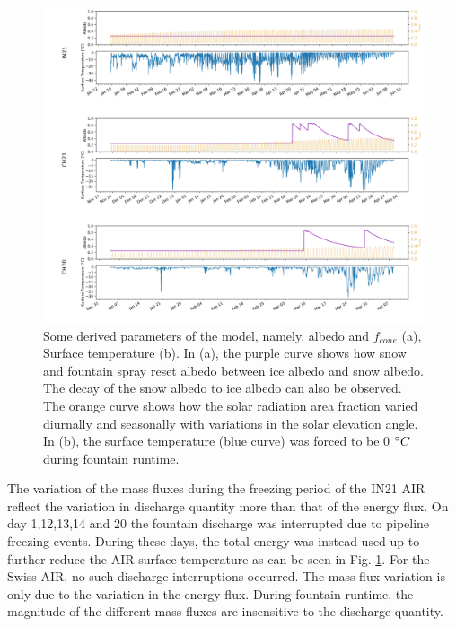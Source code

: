 \documentclass[utf8]{frontiersSCNS} %
\begin{document}
\begin{figure}
	\begin{center}
		\includegraphics[width=\linewidth]{Figures/albedo.jpg}
	\end{center}
	\caption{Some derived parameters of the model, namely, albedo and $f_{cone}$ (a), Surface temperature (b). In
		(a), the purple curve shows how snow and fountain spray reset albedo between ice albedo and snow albedo.  The
		decay of the snow albedo to ice albedo can also be observed. The orange curve shows how the solar radiation area
		fraction varied diurnally and seasonally with variations in the solar elevation angle. In (b), the surface
		temperature (blue curve) was forced to be 0 $\degree C$ during fountain runtime.}
	\label{fig:albedo}
\end{figure}

The variation of the mass fluxes during the freezing period of the IN21 AIR reflect the variation in discharge quantity
more than that of the energy flux. On day 1,12,13,14 and 20 the fountain discharge was interrupted due to pipeline
freezing events. During these days, the total energy was instead used up to further reduce the AIR surface
temperature as can be seen in Fig. \ref{fig:albedo}. For the Swiss AIR, no such discharge interruptions occurred. The mass flux variation is only due to the variation in the energy flux. During fountain runtime, the magnitude
of the different mass fluxes are insensitive to the discharge quantity.
\end{document}
